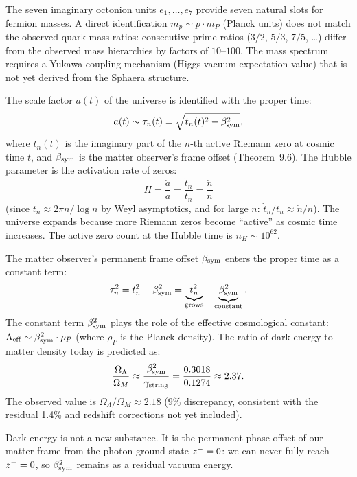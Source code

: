 \begin{remark}
The seven imaginary octonion units $e_1,\ldots,e_7$ provide seven
natural slots for fermion masses.
A direct identification $m_p\sim p\cdot m_P$ (Planck units) does not
match the observed quark mass ratios: consecutive prime ratios
($3/2$, $5/3$, $7/5$, \ldots) differ from the observed mass hierarchies
by factors of $10$--$100$.
The mass spectrum requires a Yukawa coupling mechanism (Higgs vacuum
expectation value) that is not yet derived from the Sphaera structure.
\end{remark}

\begin{theorem}
\label{thm:expansion}
The scale factor $a(t)$ of the universe is identified with the proper time:
\[
 a(t) \sim \tau_n(t) = \sqrt{t_n(t)^2-\beta_{\mathrm{sym}}^2},
\]
where $t_n(t)$ is the imaginary part of the $n$-th active Riemann zero
at cosmic time $t$, and $\beta_{\mathrm{sym}}$ is the matter observer's frame offset
(Theorem~9.6).
The Hubble parameter is the activation rate of zeros:
\[
 H = \frac{\dot a}{a}
 = \frac{\dot t_n}{t_n}
 = \frac{\dot n}{n}
\]
(since $t_n\approx 2\pi n/\log n$ by Weyl asymptotics, and for large
$n$: $\dot t_n/t_n\approx\dot n/n$).
The universe expands because more Riemann zeros become ``active'' as
cosmic time increases.
The active zero count at the Hubble time is $n_H\sim 10^{62}$.
\end{theorem}

\begin{theorem}
\label{thm:dark-offset}
The matter observer's permanent frame offset $\beta_{\mathrm{sym}}$ enters the proper
time as a constant term:
\[
 \tau_n^2 = t_n^2 - \beta_{\mathrm{sym}}^2
 = \underbrace{t_n^2}_{\text{grows}}
 - \underbrace{\beta_{\mathrm{sym}}^2}_{\text{constant}}.
\]
The constant term $\beta_{\mathrm{sym}}^2$ plays the role of the effective cosmological
constant: $\Lambda_{\mathrm{eff}}\sim\beta_{\mathrm{sym}}^2\cdot\rho_P$
(where $\rho_P$ is the Planck density).
The ratio of dark energy to matter density today is predicted as:
\[
 \frac{\Omega_\Lambda}{\Omega_M}
 \approx \frac{\beta_{\mathrm{sym}}^2}{\gamma_{\mathrm{string}}}
 = \frac{0.3018}{0.1274}
 \approx 2.37.
\]
The observed value is $\Omega_\Lambda/\Omega_M\approx 2.18$
(9\% discrepancy, consistent with the residual 1.4\% and redshift
corrections not yet included).

Dark energy is not a new substance. It is the permanent phase offset of
our matter frame from the photon ground state $z^-=0$: we can never
fully reach $z^-=0$, so $\beta_{\mathrm{sym}}^2$ remains as a residual vacuum
energy.
\end{theorem}

